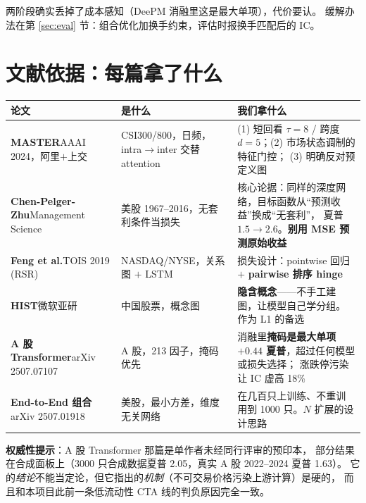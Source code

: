 \documentclass[11pt, a4paper]{ctexart}
\begin{document}
两阶段确实丢掉了成本感知（DeePM 消融里这是最大单项），代价要认。
缓解办法在第 \ref{sec:eval} 节：组合优化加换手约束，评估时报换手匹配后的 IC。

\section{文献依据：每篇拿了什么}

\begin{center}
\small
\begin{tabular}{p{3.4cm}p{4.2cm}p{7.2cm}}
\toprule
论文 & 是什么 & 我们拿什么 \\
\midrule
\textbf{MASTER}\newline AAAI 2024，阿里$+$上交 &
CSI300/800，日频，intra$\to$inter 交替 attention &
(1) 短回看 $\tau{=}8$ / 跨度 $d{=}5$；(2) 市场状态调制的特征门控；
(3) 明确反对预定义图 \\
\midrule
\textbf{Chen-Pelger-Zhu}\newline Management Science &
美股 1967--2016，无套利条件当损失 &
核心论据：同样的深度网络，目标函数从“预测收益”换成“无套利”，
夏普 $1.5 \to 2.6$。\textbf{别用 MSE 预测原始收益} \\
\midrule
\textbf{Feng et al.}\newline TOIS 2019 (RSR) &
NASDAQ/NYSE，关系图 $+$ LSTM &
损失设计：pointwise 回归 $+$ \textbf{pairwise 排序 hinge} \\
\midrule
\textbf{HIST}\newline 微软亚研 &
中国股票，概念图 &
\textbf{隐含概念}——不手工建图，让模型自己学分组。作为 L1 的备选 \\
\midrule
\textbf{A 股 Transformer}\newline arXiv 2507.07107 &
A 股，213 因子，掩码优先 &
消融里\textbf{掩码是最大单项 $+0.44$ 夏普}，超过任何模型或损失选择；
涨跌停污染让 IC 虚高 18\% \\
\midrule
\textbf{End-to-End 组合}\newline arXiv 2507.01918 &
美股，最小方差，维度无关网络 &
在几百只上训练、不重训用到 1000 只。$N$ 扩展的设计思路 \\
\bottomrule
\end{tabular}
\end{center}

\begin{warnbox}
\textbf{权威性提示}：A 股 Transformer 那篇是单作者未经同行评审的预印本，
部分结果在合成面板上（3000 只合成数据夏普 2.05，真实 A 股 2022--2024 夏普 1.63）。
它的\emph{结论}不能当定论，但它指出的\emph{机制}（不可交易价格污染上游计算）是硬的，
而且和本项目此前一条低流动性 CTA 线的判负原因完全一致。
\end{warnbox}
\end{document}
